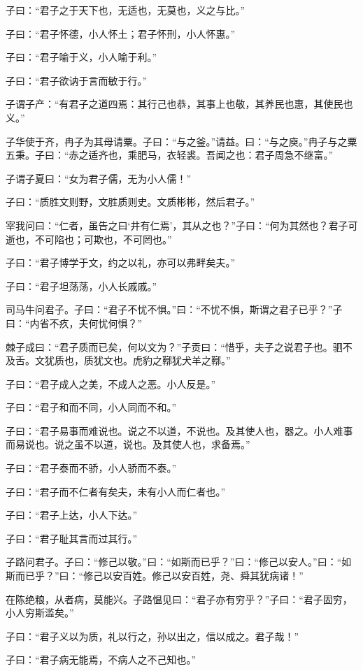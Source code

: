 \documentclass[a5paper]{ctexbook}
\begin{document}
    子曰：“君子之于天下也，无适也，无莫也，义之与比。”

    子曰：“君子怀德，小人怀土；君子怀刑，小人怀惠。”

    子曰：“君子喻于义，小人喻于利。”

    子曰：“君子欲讷于言而敏于行。”

    子谓子产：“有君子之道四焉：其行己也恭，其事上也敬，其养民也惠，其使民也义。”

    子华使于齐，冉子为其母请粟。子曰：“与之釜。”请益。曰：“与之庾。”冉子与之粟五秉。子曰：“赤之适齐也，乘肥马，衣轻裘。吾闻之也：君子周急不继富。”

    子谓子夏曰：“女为君子儒，无为小人儒！”

    子曰：“质胜文则野，文胜质则史。文质彬彬，然后君子。”

    宰我问曰：“仁者，虽告之曰‘井有仁焉’，其从之也？”子曰：“何为其然也？君子可逝也，不可陷也；可欺也，不可罔也。”

    子曰：“君子博学于文，约之以礼，亦可以弗畔矣夫。”

    子曰：“君子坦荡荡，小人长戚戚。”

    司马牛问君子。子曰：“君子不忧不惧。”曰：“不忧不惧，斯谓之君子已乎？”子曰：“内省不疚，夫何忧何惧？”

    棘子成曰：“君子质而已矣，何以文为？”子贡曰：“惜乎，夫子之说君子也。驷不及舌。文犹质也，质犹文也。虎豹之鞹犹犬羊之鞹。”

    子曰：“君子成人之美，不成人之恶。小人反是。”

    子曰：“君子和而不同，小人同而不和。”

    子曰：“君子易事而难说也。说之不以道，不说也。及其使人也，器之。小人难事而易说也。说之虽不以道，说也。及其使人也，求备焉。”

    子曰：“君子泰而不骄，小人骄而不泰。”

    子曰：“君子而不仁者有矣夫，未有小人而仁者也。”

    子曰：“君子上达，小人下达。”

    子曰：“君子耻其言而过其行。”

    子路问君子。子曰：“修己以敬。”曰：“如斯而已乎？”曰：“修己以安人。”曰：“如斯而已乎？”曰：“修己以安百姓。修己以安百姓，尧、舜其犹病诸！”

    在陈绝粮，从者病，莫能兴。子路愠见曰：“君子亦有穷乎？”子曰：“君子固穷，小人穷斯滥矣。”

    子曰：“君子义以为质，礼以行之，孙以出之，信以成之。君子哉！”

    子曰：“君子病无能焉，不病人之不己知也。”
\end{document}
